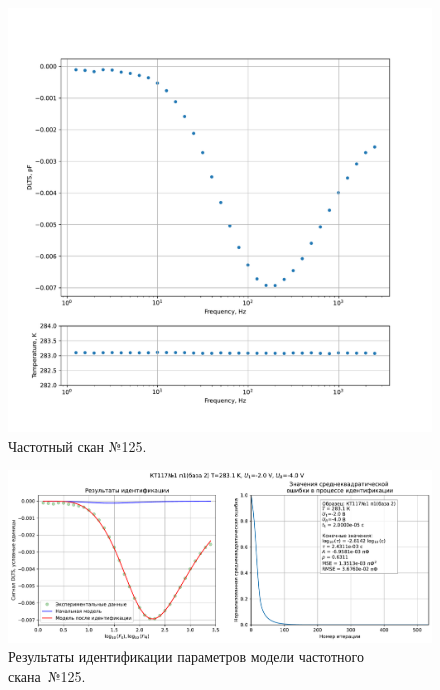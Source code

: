 \begin{figure}[!ht]
    \centering
    \includegraphics[width=1\textwidth]{../plots/КТ117№1_п1(база 2)_2500Гц-1Гц_1пФ_+10С_-2В-4В_100мВ_20мкс_шаг_0,1.pdf}
    \caption{Частотный скан №125.}
    \label{pic:frequency_scan_125}
\end{figure}

\begin{figure}[!ht]
    \centering
    \includegraphics[width=1\textwidth]{../plots/КТ117№1_п1(база 2)_2500Гц-1Гц_1пФ_+10С_-2В-4В_100мВ_20мкс_шаг_0,1_model.pdf}
    \caption{Результаты идентификации параметров модели частотного скана~№125.}
    \label{pic:frequency_scan_model125}
\end{figure}

\pagebreak


